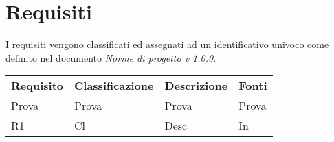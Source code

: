 
\section{Requisiti} 
I requisiti vengono classificati ed assegnati ad un identificativo  univoco come definito nel documento \textit{Norme di progetto v 1.0.0}.
\renewcommand{\arraystretch}{1.5}
\begin{center}
	
	\begin{longtable}{ >{\centering}p{} >{\centering}p{}
			>{\raggedright}p{} >{\centering}p{}}
		
		\rowcolorhead 
		\textbf{\color{white}Requisito} 
		& \textbf{\color{white}Classificazione} 
		& \centering\textbf{\color{white}Descrizione}
		& \textbf{\color{white}Fonti} 
		\tabularnewline 	
		
		Prova 
		& Prova
		& Prova 
		& Prova 
		\tabularnewline 
		R1 & Cl & Desc & In
		
		
	\end{longtable}
\end{center}

